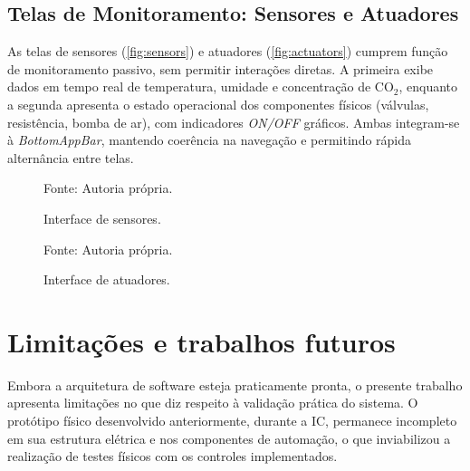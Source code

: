\subsection{Telas de Monitoramento: Sensores e Atuadores}\label{subsec:monitoramento}
As telas de sensores (\autoref{fig:sensors}) e atuadores (\autoref{fig:actuators}) cumprem função de monitoramento passivo, sem permitir interações diretas. A primeira exibe dados em tempo real de temperatura, umidade e concentração de CO$_2$, enquanto a segunda apresenta o estado operacional dos componentes físicos (válvulas, resistência, bomba de ar), com indicadores \textit{ON/OFF} gráficos. Ambas integram-se à \textit{BottomAppBar}, mantendo coerência na navegação e permitindo rápida alternância entre telas.

\begin{figure}[ht]
    \caption{Interface de sensores.}
    \label{fig:sensors}
    \centering
    \hfill
    \hfill

    {\centering\footnotesize Fonte: Autoria própria.\par}

  \end{figure}

  \begin{figure}[ht]
    \caption{Interface de atuadores.}
    \label{fig:actuators}
    \centering
    \hfill
    \hfill

    {\centering\footnotesize Fonte: Autoria própria.\par}

  \end{figure}

\section{Limitações e trabalhos futuros}

Embora a arquitetura de software esteja praticamente pronta, o presente trabalho apresenta limitações no que diz respeito à validação prática do sistema. O protótipo físico desenvolvido anteriormente, durante a IC, permanece incompleto em sua estrutura elétrica e nos componentes de automação, o que inviabilizou a realização de testes físicos com os controles implementados.
  
